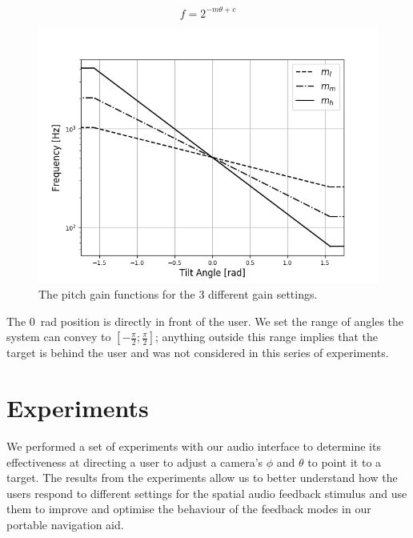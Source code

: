 \documentclass[sigconf, review=true, screen=true, anonymous=true]{acmart}
\begin{document}
\begin{equation}\label{eq:pitch-eq}
  f = 2^{-m \theta + c}
\end{equation}

\begin{figure}
  \centering
  \includegraphics[width=1.0\columnwidth]{figures/pitch_gain_functions.png}
  \caption{The pitch gain functions for the 3 different gain settings. }\label{fig:pitch-gain}
\end{figure}

The \SI{0}{\radian} position is directly in front of the user.
We set the range of angles the system can convey to $[-\frac{\pi}{2}; \frac{\pi}{2}]$; anything outside this range implies that the target is behind the user and was not considered in this series of experiments. 

\section{Experiments}\label{sec:experiments}

We performed a set of experiments with our audio interface to determine its effectiveness at directing a user to adjust a camera's $\phi$ and $\theta$ to point it to a target.
The results from the experiments allow us to better understand how the users respond to different settings for the spatial audio feedback stimulus and use them to improve and optimise the behaviour of the feedback modes in our portable navigation aid.
\end{document}
